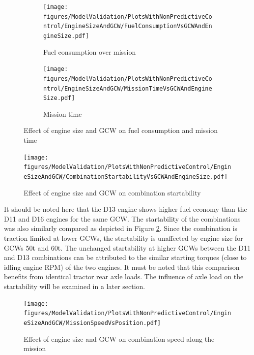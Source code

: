 \documentclass[ExampleMasters.tex]{subfiles}
\begin{document}
	\begin{figure}
	\begin{subfigure}{.5\textwidth}
	\centering
	\texttt{[image: figures/ModelValidation/PlotsWithNonPredictiveControl/EngineSizeAndGCW/FuelConsumptionVsGCWAndEngineSize.pdf]}
	\caption{Fuel consumption over mission}
	\end{subfigure}
	\begin{subfigure}{.5\textwidth}
	\centering
	\texttt{[image: figures/ModelValidation/PlotsWithNonPredictiveControl/EngineSizeAndGCW/MissionTimeVsGCWAndEngineSize.pdf]}
	\caption{Mission time}
	\end{subfigure}
	\caption{Effect of engine size and GCW on fuel consumption and mission time}
	\label{timeFuelGCWEngine}
	\end{figure}
	\begin{figure}
	\centering
	\texttt{[image: figures/ModelValidation/PlotsWithNonPredictiveControl/EngineSizeAndGCW/CombinationStartabilityVsGCWAndEngineSize.pdf]}
	\caption{Effect of engine size and GCW on combination startability}
	\label{startabilityEngineGCW}
	\end{figure}
	It should be noted here that the D13 engine shows higher fuel economy than the D11 and D16 engines for the same GCW. The startability of the combinations was also similarly compared as depicted in Figure \ref{startabilityEngineGCW}. Since the combination is traction limited at lower GCWs, the startability is unaffected by engine size for GCWs 50t and 60t. The unchanged startability at higher GCWs between the D11 and D13 combinations can be attributed to the similar starting torques (close to idling engine RPM) of the two engines. It must be noted that this comparison benefits from identical tractor rear axle loads. The influence of axle load on the startability will be examined in a later section.
	\begin{figure}
	\centering
	\texttt{[image: figures/ModelValidation/PlotsWithNonPredictiveControl/EngineSizeAndGCW/MissionSpeedVsPosition.pdf]}
	\caption{Effect of engine size and GCW on combination speed along the mission}
	\label{missionSpeedEngineSizeGCW}
	\end{figure}
\end{document}
